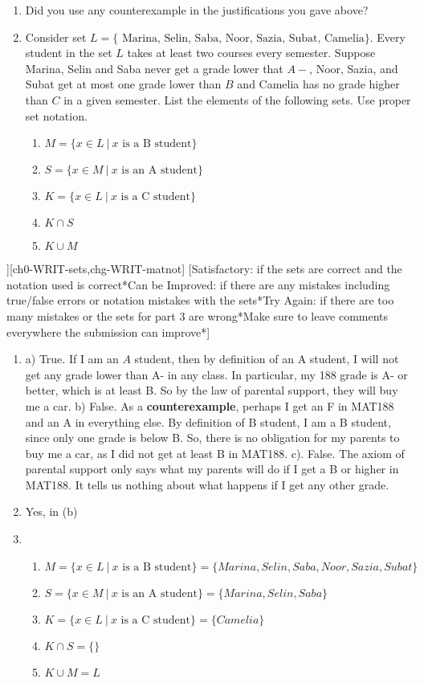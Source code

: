 \begin{SaveQuestion}
{\begin{enumerate}
        \item Did you use any counterexample in the justifications you gave above?
	\item Consider set $L=\{\text{ Marina, Selin,  Saba, Noor, Sazia, Subat, Camelia}\}$. Every student in the set $L$ takes at least two courses every semester. Suppose Marina, Selin and Saba never get a grade lower that $A-$, Noor, Sazia, and Subat get at most one grade lower than $B$ and Camelia has no grade higher than $C$ in a given semester. List the elements of the following sets. Use proper set notation.
	\begin{enumerate}
		\item $M=\{x\in L\:|\: x \text{ is a B student}\}$
		\item $S=\{x\in M\:|\: x \text{ is an A student}\}$
		\item $K=\{x\in L\:|\: x \text{ is a C student}\}$
		\item $K\cap S$
		\item $K\cup M$
	\end{enumerate}
\end{enumerate}
  }][ch0-WRIT-sets,chg-WRIT-matnot]
  [Satisfactory: if the sets are correct and the notation used is correct*Can be Improved: if there are any mistakes including true/false errors or notation mistakes with the sets*Try Again: if there are too many mistakes or the sets for part 3 are wrong*Make sure to leave comments everywhere the submission can improve*]
    \begin{enumerate}
    \item
    a) True. If I am an $A$ student, then by definition of an A student, I will not get any grade lower than A- in any class. In particular, my 188 grade is A- or better, which is at least B. So by the law of parental support, they will buy me a car.
    b) False. As a \textbf{counterexample}, perhaps I get an F in MAT188 and an A in everything else. By definition of B student, I am a B student, since only one grade is below B. So, there is no obligation for my parents to buy me a car, as I did not get at least B in MAT188. 
    c). False. The axiom of parental support only says what my parents will do if I get a B or higher in MAT188. It tells us nothing about what happens if I get any other grade.
    \item Yes, in (b)
    \item
    \begin{enumerate}
    \item $M=\{x\in L\:|\: x \text{ is a B student}\}=\{Marina, Selin, Saba, Noor, Sazia, Subat \}$
    \item$ S=\{x\in M\:|\: x \text{ is an A student}\}=\{Marina, Selin, Saba\}$
    \item $K=\{x\in L\:|\: x \text{ is a C student}\}=\{Camelia \}$
    \item $K\cap S=\{\}$
    \item $K\cup M=L$
    \end{enumerate}
    \end{enumerate}
\end{SaveQuestion}


